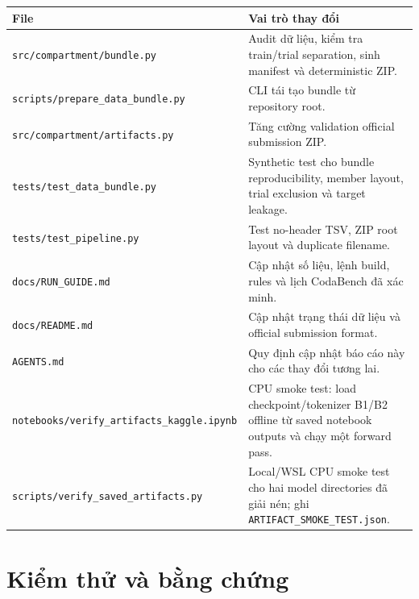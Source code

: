 \documentclass[11pt,a4paper]{article}
\newcommand{\code}[1]{\nolinkurl{#1}}
\begin{document}
\small
\begin{longtable}{@{}p{}p{}@{}}
\toprule
File & Vai trò thay đổi \\
\midrule
\endhead
\code{src/compartment/bundle.py} & Audit dữ liệu, kiểm tra train/trial separation, sinh manifest và deterministic ZIP. \\
\code{scripts/prepare_data_bundle.py} & CLI tái tạo bundle từ repository root. \\
\code{src/compartment/artifacts.py} & Tăng cường validation official submission ZIP. \\
\code{tests/test_data_bundle.py} & Synthetic test cho bundle reproducibility, member layout, trial exclusion và target leakage. \\
\code{tests/test_pipeline.py} & Test no-header TSV, ZIP root layout và duplicate filename. \\
\code{docs/RUN_GUIDE.md} & Cập nhật số liệu, lệnh build, rules và lịch CodaBench đã xác minh. \\
\code{docs/README.md} & Cập nhật trạng thái dữ liệu và official submission format. \\
\code{AGENTS.md} & Quy định cập nhật báo cáo này cho các thay đổi tương lai. \\
\code{notebooks/verify_artifacts_kaggle.ipynb} & CPU smoke test: load checkpoint/tokenizer B1/B2 offline từ saved notebook outputs và chạy một forward pass. \\
\code{scripts/verify_saved_artifacts.py} & Local/WSL CPU smoke test cho hai model directories đã giải nén; ghi \code{ARTIFACT_SMOKE_TEST.json}. \\
\bottomrule
\end{longtable}
\normalsize

\section{Kiểm thử và bằng chứng}
\end{document}
